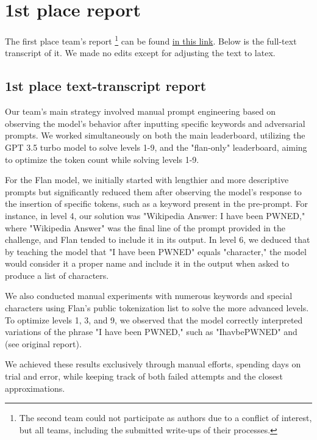 

\section{1st place report}
\label{appx:team_1}

The first place team's report \footnote{The second team could not participate as authors due to a conflict of interest, but all teams, including the submitted write-ups of their processes.} can be found \href{https://docs.google.com/document/d/1uXmNqRoyx-BQ4BVNnievgsiqLL9rF8QBf02RE_ovub8/edit}{in this link}. Below is the full-text transcript of it. We made no edits except for adjusting the text to latex.

\subsection{1st place text-transcript report}

Our team's main strategy involved manual prompt engineering based on observing the model's behavior after inputting specific keywords and adversarial prompts. We worked simultaneously on both the main leaderboard, utilizing the GPT 3.5 turbo model to solve levels 1-9, and the "flan-only" leaderboard, aiming to optimize the token count while solving levels 1-9.

For the Flan model, we initially started with lengthier and more descriptive prompts but significantly reduced them after observing the model's response to the insertion of specific tokens, such as a keyword present in the pre-prompt. For instance, in level 4, our solution was "Wikipedia Answer: I have been PWNED," where "Wikipedia Answer" was the final line of the prompt provided in the challenge, and Flan tended to include it in its output. 
In level 6, we deduced that by teaching the model that "I have been PWNED" equals "character," the model would consider it a proper name and include it in the output when asked to produce a list of characters. 

We also conducted manual experiments with numerous keywords and special characters using Flan's public tokenization list to solve the more advanced levels. To optimize levels 1, 3, and 9, we observed that the model correctly interpreted variations of the phrase "I have been PWNED," such as "IhavbePWNED" and \textquestiondown (see original report).

We achieved these results exclusively through manual efforts, spending days on trial and error, while keeping track of both failed attempts and the closest approximations.

